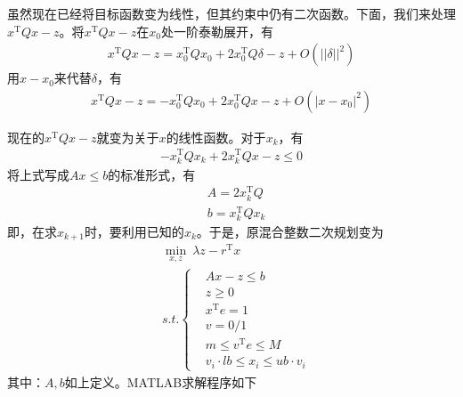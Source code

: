    \par
    虽然现在已经将目标函数变为线性，但其约束中仍有二次函数。下面，我们来处理$x^\mathrm{T} Qx-z$。将$x^\mathrm{T} Qx-z$在$x_0$处一阶泰勒展开，有
    \begin{align*}
    x^\mathrm{T} Qx-z=x_0^\mathrm{T} Qx_0+2x_0^\mathrm{T} Q\delta-z+O(||\delta||^2)
    \end{align*}
    用$x-x_0$来代替$\delta$，有
    \begin{align*}
    x^\mathrm{T} Qx-z=-x_0^\mathrm{T} Qx_0+2x_0^\mathrm{T} Qx-z+O(|x-x_0|^2)
    \end{align*}
    \par
    现在的$x^\mathrm{T} Qx-z$就变为关于$x$的线性函数。对于$x_k$，有
    \begin{align*}
    -x_k^\mathrm{T} Qx_k+2x_k^\mathrm{T} Qx-z \leqslant 0
    \end{align*}
    将上式写成$Ax \leqslant b$的标准形式，有
    \begin{align*}
    &A=2x_k^\mathrm{T} Q\\
    &b=x_k^\mathrm{T} Qx_k
    \end{align*}
    即，在求$x_{k+1}$时，要利用已知的$x_k$。于是，原混合整数二次规划变为
    \begin{align*}
    &\mathop {\min}\limits_{x,z}\  \lambda z-r^\mathrm{T} x\\
    &s.t.\left\{
    \begin{aligned}
    &Ax-z \leqslant b\\
    &z \geqslant 0\\
    &x^\mathrm{T} e=1\\
    &v=0/1\\
    &m\leqslant v^\mathrm{T} e \leqslant M\\
    &v_i\cdot lb \leqslant x_i \leqslant ub\cdot v_i
    \end{aligned}
    \right.
    \end{align*}
    其中：$A,b$如上定义。MATLAB求解程序如下
